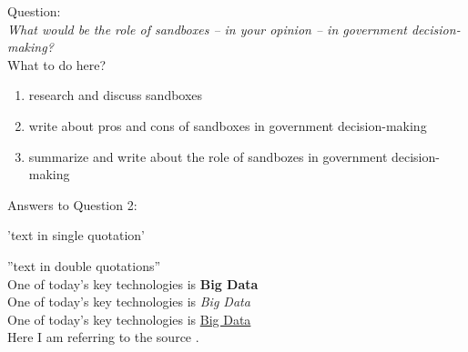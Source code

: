 Question:\\
\emph{
    What would be the role of sandboxes – in your opinion – in government decision-making?
}\\

What to do here?
\begin{enumerate}
    \item research and discuss sandboxes
    \item write about pros and cons of sandboxes in government decision-making
    \item summarize and write about the role of sandbozes in government decision-making
  \end{enumerate}

Answers to Question 2:

'text in single quotation'

''text in double quotations''\\

One of today’s key technologies is \textbf{Big Data}\\
One of today’s key technologies is \textit{Big Data}\\
One of today’s key technologies is \underline{Big Data}\\

Here I am referring to the source \cite{BigData}.